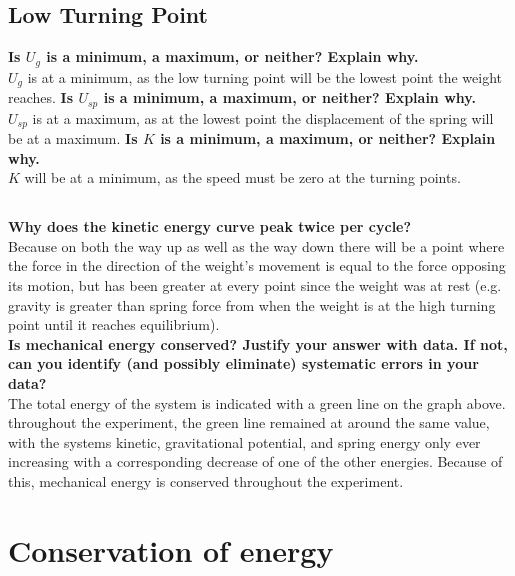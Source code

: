 \documentclass[11pt, letterpaper, includehead]{article}
\begin{document}
\subsection{Low Turning Point}
\textbf{Is $U_g$ is a minimum, a maximum, or neither? Explain why.}\\
$U_g$ is at a minimum, as the low turning point will be the lowest point the weight
reaches.
\textbf{Is $U_{sp}$ is a minimum, a maximum, or neither? Explain why.}\\
$U_{sp}$ is at a maximum, as at the lowest point the displacement of the spring will
be at a maximum.
\textbf{Is $K$ is a minimum, a maximum, or neither? Explain why.}\\
$K$ will be at a minimum, as the speed must be zero at the turning points.

\subsection{}
\textbf{Why does the kinetic energy curve peak twice per cycle?}\\
Because on both the way up as well as the way down there will be a point where the
force in the direction of the weight's movement is equal to the force opposing its 
motion, but has been greater at every point since the weight was at rest (e.g.
gravity is greater than spring force from when the weight is at the high turning
point until it reaches equilibrium).\\
\textbf{Is mechanical energy conserved? Justify your answer with 
data. If not, can you identify (and possibly eliminate) systematic 
errors in your data?}\\
The total energy of the system is indicated with a green line on the graph above.
throughout the experiment, the green line remained at around the same value, with 
the systems kinetic, gravitational potential, and spring energy only ever increasing
with a corresponding decrease of one of the other energies. Because of this,
mechanical energy is conserved throughout the experiment.
\section{Conservation of energy}
\end{document}
